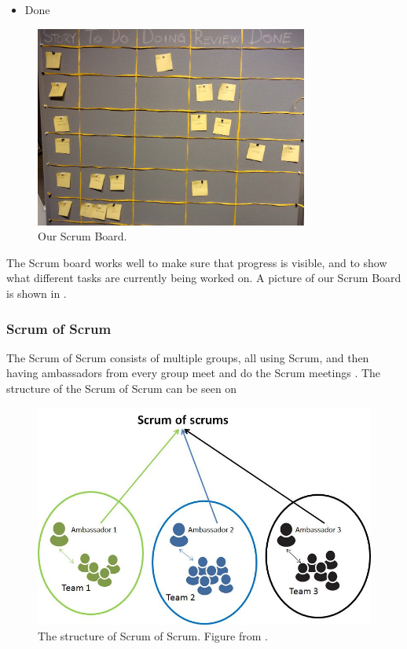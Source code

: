 \begin{description}
\begin{itemize}
		\item Done
	\end{itemize}
	\begin{figure}
	  \begin{center}
	    \includegraphics[width=0.80\textwidth]{figures/img/scrumboard_compressed.jpg}
	  \end{center}
	  \caption{Our Scrum Board.}
	  \label{fig:scrumboard}
	\end{figure}
	The Scrum board works well to make sure that progress is visible, and to show what different tasks are currently being worked on.
	A picture of our Scrum Board is shown in .
\end{description}

\subsubsection*{Scrum of Scrum}
The Scrum of Scrum consists of multiple groups, all using Scrum, and then having ambassadors from every group meet and do the Scrum meetings \cite{ScrumBOOK}.
The structure of the Scrum of Scrum can be seen on 

\begin{figure}
\centering
\includegraphics[scale=0.4]{figures/ScrumofScrum.png}
\caption{The structure of Scrum of Scrum. Figure from \cite{ScrumofScrumfigure}.}
\label{fig:ScrumofScrum}
\end{figure}

